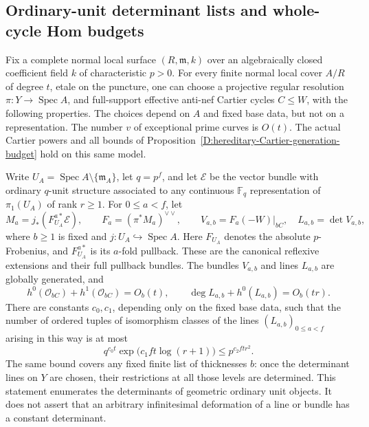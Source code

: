\subsection{Ordinary-unit determinant lists and whole-cycle Hom budgets}

\begin{lemma}
\label{D:hereditary-ordinary-unit-determinants}
Fix a complete normal local surface $(R,\mathfrak m,k)$ over an
algebraically closed coefficient field $k$ of characteristic $p>0$.
For every finite normal local cover $A/R$ of degree $t$, etale on
the puncture, one can choose a projective regular resolution
$\pi:Y\to\operatorname{Spec}A$, and full-support effective
anti-nef Cartier cycles $C\le W$, with the following properties.
The choices depend on $A$ and fixed base data, but not on a
representation. The number $v$ of exceptional prime curves is
$O(t)$. The actual Cartier powers and all bounds of
Proposition~\ref{D:hereditary-Cartier-generation-budget} hold on
this same model.

Write $U_A=\operatorname{Spec}A\setminus\{\mathfrak m_A\}$,
let $q=p^f$, and let $\mathcal E$ be the vector bundle with
ordinary $q$-unit structure associated to any continuous
$\mathbb F_q$ representation of $\pi_1(U_A)$ of rank $r\ge1$.
For $0\le a<f$, let
\[
 M_a=j_*(F_{U_A}^{a*}\mathcal E),\qquad
 F_a=(\pi^*M_a)^{\vee\vee},\qquad
 V_{a,b}=F_a(-W)|_{bC},\quad L_{a,b}=\det V_{a,b},
                                                        \tag{D.UD.1}
\]
where $b\ge1$ is fixed and $j:U_A\hookrightarrow\operatorname{Spec}A$.
Here $F_{U_A}$ denotes the absolute $p$-Frobenius, and
$F_{U_A}^{a*}$ is its $a$-fold pullback.
These are the canonical reflexive extensions and their full
pullback bundles. The bundles $V_{a,b}$ and lines $L_{a,b}$ are
globally generated, and
\[
 h^0(\mathcal O_{bC})+h^1(\mathcal O_{bC})=O_b(t),\qquad
 \deg L_{a,b}+h^0(L_{a,b})=O_b(tr).                    \tag{D.UD.2}
\]
There are constants $c_0,c_1$, depending only on the fixed base
data, such that the number of ordered tuples of isomorphism
classes of the lines $(L_{a,b})_{0\le a<f}$ arising in this way
is at most
\[
 q^{c_0t}\exp\!\bigl(c_1ft\log(r+1)\bigr)
                       \le p^{c_2ftr^2}.               \tag{D.UD.3}
\]
The same bound covers any fixed finite list of thicknesses $b$:
once the determinant lines on $Y$ are chosen, their restrictions
at all those levels are determined. This statement enumerates
the determinants of geometric ordinary unit objects. It does
not assert that an arbitrary infinitesimal deformation of a
line or bundle has a constant determinant.
\end{lemma}


